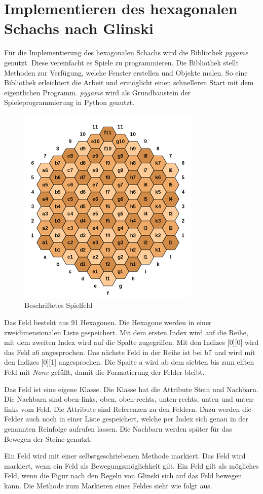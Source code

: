 

\chapter{Implementieren des hexagonalen Schachs nach Glinski}
Für die Implementierung des hexagonalen Schachs wird die Bibliothek \textit{pygame} genutzt. Diese vereinfacht es Spiele zu programmieren. Die Bibliothek stellt Methoden zur Verfügung, welche Fenster erstellen und Objekte malen. So eine Bibliothek erleichtert die Arbeit und ermöglicht einen schnelleren Start mit dem eigentlichen Programm. \textit{pygame} wird als Grundbaustein der Spieleprogrammierung in Python genutzt.

\begin{figure}[H]
    \centering
    \includegraphics{images/hexIndex.png}
    \caption{Beschriftetes Spielfeld \protect\footnotemark}
    \label{fig:hex:index}
\end{figure}

Das Feld besteht aus 91 Hexagonen. Die Hexagone werden in einer zweidimensionalen Liste gespeichert. Mit dem ersten Index wird auf die Reihe, mit dem zweiten Index wird auf die Spalte zugegriffen. Mit den Indizes [0][0] wird das Feld  a6 angesprochen. Das nächste Feld in der Reihe ist bei b7 und wird mit den Indizes [0][1] angesprochen. Die Spalte a wird ab dem siebten bis zum elften Feld mit \textit{None} gefüllt, damit die Formatierung der Felder bleibt.\par
Das Feld ist eine eigene Klasse. Die Klasse hat die Attribute Stein und Nachbarn. Die Nachbarn sind oben-links, oben, oben-rechts, unten-rechts, unten und unten-links vom Feld. Die Attribute sind Referenzen zu den Feldern. Dazu werden die Felder auch noch in einer Liste gespeichert, welche per Index sich genau in der genannten Reinfolge aufrufen lassen. Die Nachbarn werden später für das Bewegen der Steine genutzt.\par
Ein Feld wird mit einer selbstgeschriebenen Methode markiert. Das Feld wird markiert, wenn ein Feld als Bewegungsmöglichkeit gilt. Ein Feld gilt als mögliches Feld, wenn die Figur nach den Regeln von Glinski sich auf das Feld bewegen kann. Die Methode zum Markieren eines Feldes sieht wie folgt aus.

